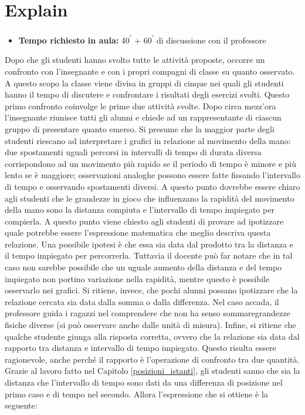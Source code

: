 \documentclass{report} \usepackage[T1]{fontenc} \usepackage[italian]{babel}
\begin{document}
\section{Explain}\label{velocità_explain}

\begin{itemize}
\item \textbf{Tempo richiesto in aula:} 40\textsuperscript{$\prime$}
      + 60\textsuperscript{$\prime$} di discussione con il professore
\end{itemize}

Dopo che gli studenti hanno svolto tutte le attività proposte, occorre un
confronto con l’insegnante e con i propri compagni di classe su quanto
osservato. A questo scopo la classe viene divisa in gruppi di cinque nei quali gli
studenti hanno il tempo di discutere e confrontare i risultati degli esercizi
svolti. Questo primo confronto coinvolge le prime due attività svolte. Dopo
circa mezz’ora l’insegnante riunisce tutti gli alunni e chiede ad un
rappresentante di ciascun gruppo di presentare quanto emerso.
Si presume che la maggior parte degli studenti riescano ad interpretare i
grafici in relazione al movimento della mano: due spostamenti uguali percorsi
in intervalli di tempo di durata diversa corrispondono ad un movimento più
rapido se il periodo di tempo è minore e più lento se è maggiore; osservazioni
analoghe possono essere fatte fissando l’intervallo di tempo e osservando
spostamenti diversi.
A questo punto dovrebbe essere chiaro agli studenti che le grandezze in gioco
che influenzano la rapidità del movimento della mano sono la distanza compiuta
e l’intervallo di tempo impiegato per compierla. A questo punto viene chiesto
agli studenti di provare ad ipotizzare quale potrebbe essere l’espressione
matematica che meglio descriva questa relazione. Una possibile ipotesi è che
essa sia data dal prodotto tra la distanza e il tempo impiegato per
percorrerla. Tuttavia il docente può far notare che in tal caso non sarebbe
possibile che un uguale aumento della distanza e del tempo impiegato non portino
variazione nella rapidità, mentre questo è possibile osservarlo nei grafici. Si
ritiene, invece, che pochi alunni possano ipotizzare che la relazione cercata
sia data dalla somma o dalla differenza. Nel caso accada, il professore guida i
ragazzi nel comprendere che non ha senso  sommaregrandezze fisiche diverse
(si può osservare anche dalle unità di misura). Infine, si
ritiene che qualche studente giunga alla risposta corretta, ovvero che la
relazione sia data dal rapporto tra distanza e intervallo di tempo impiegato.
Questo risulta essere ragionevole, anche perché il rapporto è l'operazione
di confronto tra due quantità.
Grazie al lavoro fatto nel Capitolo \ref{posizioni_istanti}, gli studenti sanno
che sia la  distanza che l’intervallo di tempo sono dati da una differenza
di posizione nel  primo caso e di tempo nel secondo. Allora l’espressione
che si ottiene è la seguente:
\end{document}
